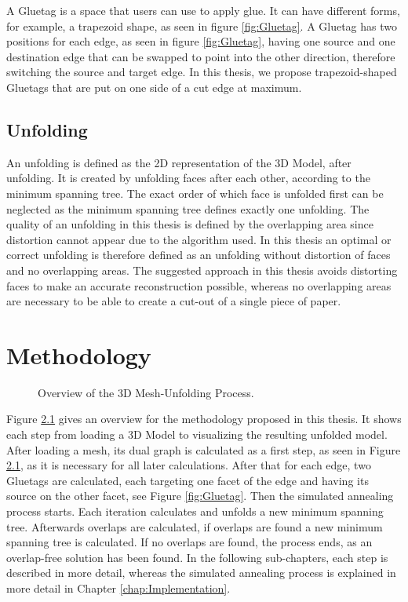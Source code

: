 \documentclass[draft,final]{vutinfth} %
\begin{document}
A Gluetag is a space that users can use to apply glue. It can have different forms, for example, a trapezoid shape, as seen in figure \ref{fig:Gluetag}. A Gluetag has two positions for each edge, as seen in figure \ref{fig:Gluetag}, having one source and one destination edge that can be swapped to point into the other direction, therefore switching the source and target edge. In this thesis, we propose trapezoid-shaped Gluetags that are put on one side of a cut edge at maximum.

\section{Unfolding}
An unfolding is defined as the 2D representation of the 3D Model, after unfolding. It is created by unfolding faces after each other, according to the minimum spanning tree. The exact order of which face is unfolded first can be neglected as the minimum spanning tree defines exactly one unfolding. The quality of an unfolding in this thesis is defined by the overlapping area since distortion cannot appear due to the algorithm used. In this thesis an optimal or correct unfolding is therefore defined as an unfolding without distortion of faces and no overlapping areas. The suggested approach in this thesis avoids distorting faces to make an accurate reconstruction possible, whereas no overlapping areas are necessary to be able to create a cut-out of a single piece of paper.

\chapter{Methodology}
\label{chap:methodology}

\begin{figure}

\caption{Overview of the 3D Mesh-Unfolding Process.}
\label{fig:overview}
\end{figure}

Figure \ref{fig:overview} gives an overview for the methodology proposed in this thesis. It shows each step from loading a 3D Model to visualizing the resulting unfolded model. After loading a mesh, its dual graph is calculated as a first step, as seen in Figure \ref{fig:overview}, as it is necessary for all later calculations. After that for each edge, two Gluetags are calculated, each targeting one facet of the edge and having its source on the other facet, see Figure \ref{fig:Gluetag}. Then the simulated annealing process starts. Each iteration calculates and unfolds a new minimum spanning tree. Afterwards overlaps are calculated, if overlaps are found a new minimum spanning tree is calculated. If no overlaps are found, the process ends, as an overlap-free solution has been found. In the following sub-chapters, each step is described in more detail, whereas the simulated annealing process is explained in more detail in Chapter \ref{chap:Implementation}.
\end{document}
